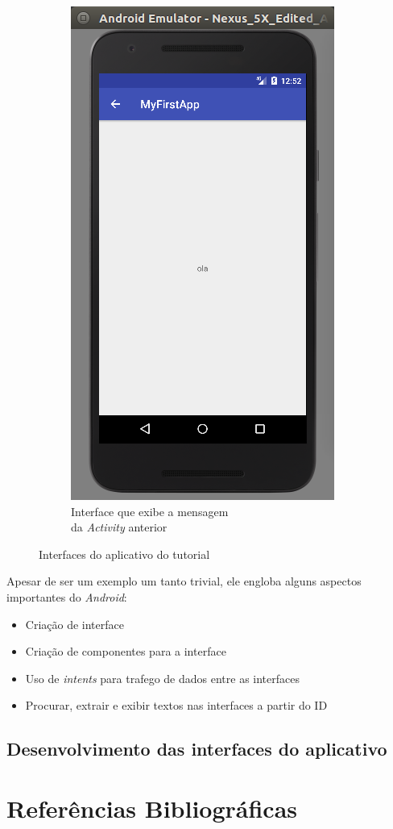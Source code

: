 \documentclass[hidelinks,12pt]{article}
\begin{document}
\begin{figure}[H]
\begin{subfigure}{0.5\textwidth}
		\includegraphics[scale=0.5]{hw_result}
		\caption{Interface que exibe a mensagem\\\hspace{\textwidth}da \textit{Activity} anterior\\\hspace{\textwidth}}
		\label{hw_result}
	\end{subfigure}
	\caption{Interfaces do aplicativo do tutorial}
	\label{hw}
\end{figure}

Apesar de ser um exemplo um tanto trivial, ele engloba alguns aspectos importantes do \textit{Android}:
\begin{itemize}
	\item Cria\c{c}\~ao de interface
	\item Cria\c{c}\~ao de componentes para a interface
	\item Uso de \textit{intents} para trafego de dados entre as interfaces
	\item Procurar, extrair e exibir textos nas interfaces a partir do ID
\end{itemize}
\subsection{Desenvolvimento das interfaces do aplicativo}
\newpage
\section*{Refer\^encias Bibliogr\'aficas}
\renewcommand\refname{}


\end{document}
